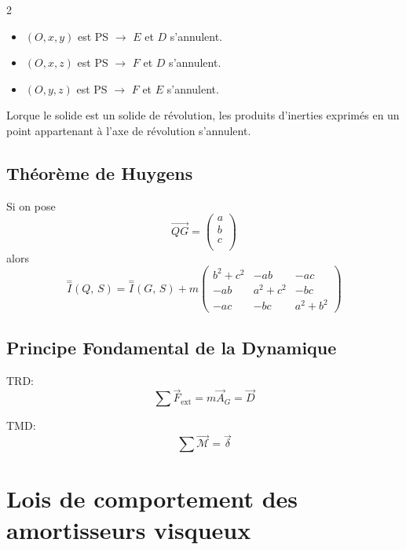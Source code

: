 \documentclass[10pt,a4paper]{article}
\renewcommand{\vec}{\overrightarrow}
\newcommand{\Inertie}[2]{\overset{=}{I}(#1,\,#2)}
\begin{document}
\begin{multicols}{2}
        \begin{itemize}
            \item $(O, x, y)$ est PS $\rightarrow$ $E$ et $D$ s'annulent.
            \item $(O, x, z)$ est PS $\rightarrow$ $F$ et $D$ s'annulent.
            \item $(O, y, z)$ est PS $\rightarrow$ $F$ et $E$ s'annulent.
        \end{itemize}

        \medskip

        Lorque le solide est un solide de révolution, les produits d'inerties exprimés en un point appartenant à l'axe de révolution s'annulent.


        \subsection{Théorème de Huygens}

            Si on pose 
            $$ \vec{QG} = \begin{pmatrix}
                a \\ b \\ c \\
                \end{pmatrix} $$
            alors 
            $$ \Inertie{Q}{S} = \Inertie{G}{S} + m \begin{pmatrix}
                b^2+c^2 & -ab & -ac \\
                -ab & a^2+c^2 & -bc \\
                -ac & -bc & a^2+b^2
            \end{pmatrix} $$


        \subsection{Principe Fondamental de la Dynamique}

            TRD:
            \[
            \sum \vec F_{\text{ext}} = m \vec A_G = \vec D
            \]

            TMD:
            $$ \sum \vec{\mathcal{M}} = \vec \delta $$



       \section{Lois de comportement des amortisseurs visqueux}


\end{multicols}
\end{document}
